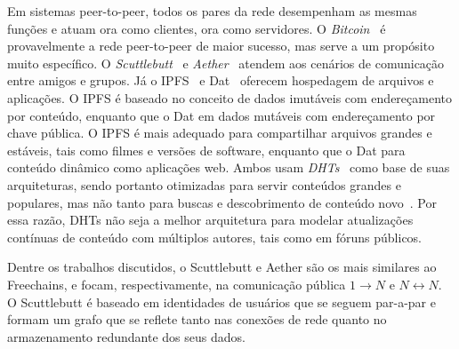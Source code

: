 \documentclass[12pt]{article}
\newcommand{\FC} {Freechains\xspace}
\newcommand{\Xon} {$1{\rightarrow}N$\xspace}
\newcommand{\Xnn} {$N{\leftrightarrow}N$\xspace}
\begin{document}
Em sistemas peer-to-peer, todos os pares da rede desempenham as mesmas funções
e atuam ora como clientes, ora como servidores.
O \emph{Bitcoin}~\cite{p2p.bitcoin} é provavelmente a rede peer-to-peer de
maior sucesso, mas serve a um propósito muito específico.
O \emph{Scuttlebutt}~\cite{p2p.scuttlebutt} e \emph{Aether}~\cite{TODO} atendem
aos cenários de comunicação entre amigos e grupos.
Já o IPFS~\cite{p2p.ipfs} e Dat~\cite{p2p.dat} oferecem hospedagem de arquivos
e aplicações.
O IPFS é baseado no conceito de dados imutáveis com endereçamento por conteúdo,
enquanto que o Dat em dados mutáveis com endereçamento por chave pública.
O IPFS é mais adequado para compartilhar arquivos grandes e estáveis, tais como
filmes e versões de software, enquanto que o Dat para conteúdo dinâmico como
aplicações web.
Ambos usam \emph{DHTs}~\cite{TODO} como base de suas arquiteturas, sendo
portanto otimizadas para servir conteúdos grandes e populares, mas não tanto
para buscas e descobrimento de conteúdo novo~\cite{TODO}.
Por essa razão, DHTs não seja a melhor arquitetura para modelar atualizações
contínuas de conteúdo com múltiplos autores, tais como em fóruns públicos.

Dentre os trabalhos discutidos, o Scuttlebutt e Aether são os mais similares ao
\FC, e focam, respectivamente, na comunicação pública \Xon e \Xnn.
O Scuttlebutt é baseado em identidades de usuários que se seguem par-a-par e
formam um grafo que se reflete tanto nas conexões de rede quanto no
armazenamento redundante dos seus dados.
\end{document}
